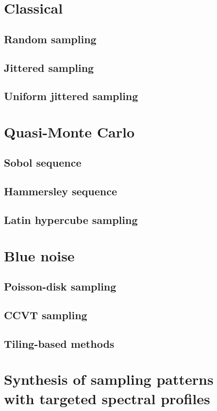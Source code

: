 \documentclass[11pt,fleqn]{book} %
\begin{document}
\section{Classical}
\subsection{Random sampling}
\subsection{Jittered sampling}
\subsection{Uniform jittered sampling}

\section{Quasi-Monte Carlo}
\subsection{Sobol sequence}
\subsection{Hammersley sequence}
\subsection{Latin hypercube sampling}

\section{Blue noise}
\subsection{Poisson-disk sampling}
\subsection{CCVT sampling}
\subsection{Tiling-based methods}

\section{Synthesis of sampling patterns with targeted spectral profiles}
\end{document}
